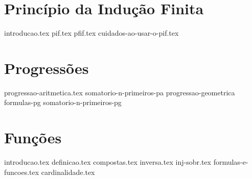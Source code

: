 \documentclass[a4paper,12pt, oneside]{book}
\begin{document}
    \chapter{Princípio da Indução Finita}
    {introducao.tex}
    {pif.tex}
    {pfif.tex}
    {cuidados-ao-usar-o-pif.tex}

    \chapter{Progressões}
    {progressao-aritmetica.tex}
    {somatorio-n-primeiros-pa}
    {progressao-geometrica}
    {formulas-pg}
    {somatorio-n-primeiros-pg}
    
    \chapter{Funções}
    {introducao.tex}
    {definicao.tex}
    {compostas.tex}
    {inversa.tex}
    {inj-sobr.tex}
    {formulas-e-funcoes.tex}
    {cardinalidade.tex}
    
\end{document}
